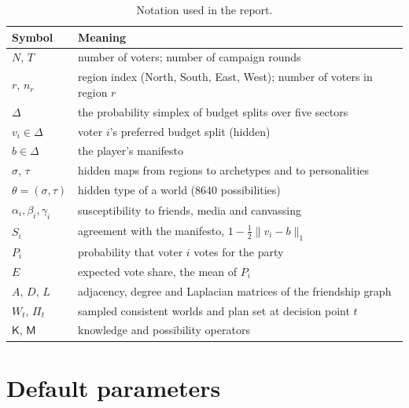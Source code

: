 \documentclass[11pt,a4paper,oneside]{report}
\newcommand{\simplex}{\Delta}
\newcommand{\Kop}{\mathsf{K}}
\newcommand{\Mop}{\mathsf{M}}
\begin{document}
\begin{table}[h]
\centering
\caption{Notation used in the report.}
\label{tab:notation}
\small
\begin{tabularx}{\linewidth}{@{}lX@{}}
\toprule
Symbol & Meaning \\
\midrule
$N$, $T$            & number of voters; number of campaign rounds \\
$r$, $n_r$          & region index (North, South, East, West); number of voters in region $r$ \\
$\simplex$          & the probability simplex of budget splits over five sectors \\
$v_i \in \simplex$  & voter $i$'s preferred budget split (hidden) \\
$b \in \simplex$    & the player's manifesto \\
$\sigma$, $\tau$    & hidden maps from regions to archetypes and to personalities \\
$\theta = (\sigma,\tau)$ & hidden type of a world (8640 possibilities) \\
$\alpha_i,\beta_i,\gamma_i$ & susceptibility to friends, media and canvassing \\
$S_i$               & agreement with the manifesto, $1 - \tfrac12\lVert v_i - b\rVert_1$ \\
$P_i$               & probability that voter $i$ votes for the party \\
$E$                 & expected vote share, the mean of $P_i$ \\
$A$, $D$, $L$       & adjacency, degree and Laplacian matrices of the friendship graph \\
$W_t$, $\Pi_t$      & sampled consistent worlds and plan set at decision point $t$ \\
$\Kop$, $\Mop$      & knowledge and possibility operators \\
\bottomrule
\end{tabularx}
\end{table}

\section*{Default parameters}
\end{document}
